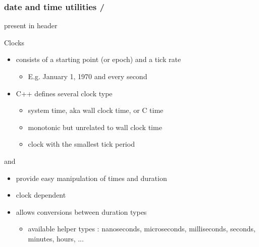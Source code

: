 \begin{frame}[fragile]
  \frametitle{\cpp date and time utilities \hfill {} / }
   present in  header
  \begin{block}{Clocks}
    \begin{itemize}
    \item consists of a starting point (or epoch) and a tick rate
      \begin{itemize}
      \item E.g. January 1, 1970 and every second
      \end{itemize}
    \item C++ defines several clock type
      \begin{itemize}
      \item \href{https://en.cppreference.com/w/cpp/chrono/system_clock}{\color{blue!50!white} } system time, aka wall clock time, or C time
      \item \href{https://en.cppreference.com/w/cpp/chrono/steady_clock}{\color{blue!50!white} } monotonic but unrelated to wall clock time
      \item \href{https://en.cppreference.com/w/cpp/chrono/high_resolution_clock}{\color{blue!50!white} } clock with the smallest tick period
      \end{itemize}
    \end{itemize}
  \end{block}
  \begin{block}{\href{https://en.cppreference.com/w/cpp/chrono/time_point}{\color{blue!50!white} } and \href{https://en.cppreference.com/w/cpp/chrono/duration}{\color{blue!50!white} }}
    \begin{itemize}
    \item provide easy manipulation of times and duration
    \item clock dependent
    \item \href{https://en.cppreference.com/w/cpp/chrono/duration/duration_cast}{\color{blue!50!white} } allows conversions between duration types
      \begin{itemize}
      \item available helper types : nanoseconds, microseconds, milliseconds, seconds, minutes, hours, ...
      \end{itemize}
    \end{itemize}
  \end{block}
\end{frame}

